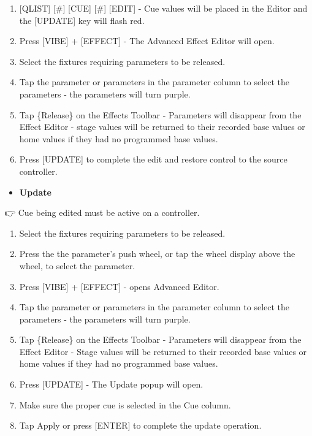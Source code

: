 \documentclass[
]{article}
\providecommand{\tightlist}{%
  \setlength{\itemsep}{0pt}\setlength{\parskip}{0pt}}
\begin{document}
\begin{enumerate}
\def\labelenumi{\arabic{enumi}.}
\item
  {[}QLIST{]} {[}\#{]} {[}CUE{]} {[}\#{]} {[}EDIT{]} - Cue values will be placed in the Editor and the {[}UPDATE{]} key will flash red.
\item
  Press {[}VIBE{]} + {[}EFFECT{]} - The Advanced Effect Editor will open.
\item
  Select the fixtures requiring parameters to be released.
\item
  Tap the parameter or parameters in the parameter column to select the parameters - the parameters will turn purple.
\item
  Tap \{Release\} on the Effects Toolbar - Parameters will disappear from the Effect Editor - stage values will be returned to their recorded base values or home values if they had no programmed base values.
\item
  Press {[}UPDATE{]} to complete the edit and restore control to the source controller.
\end{enumerate}

\begin{itemize}
\tightlist
\item
  \textbf{Update}
\end{itemize}

👉 Cue being edited must be active on a controller.

\begin{enumerate}
\def\labelenumi{\arabic{enumi}.}
\item
  Select the fixtures requiring parameters to be released.
\item
  Press the the parameter's push wheel, or tap the wheel display above the wheel, to select the parameter.
\item
  Press {[}VIBE{]} + {[}EFFECT{]} - opens Advanced Editor.
\item
  Tap the parameter or parameters in the parameter column to select the parameters - the parameters will turn purple.
\item
  Tap \{Release\} on the Effects Toolbar - Parameters will disappear from the Effect Editor - Stage values will be returned to their recorded base values or home values if they had no programmed base values.
\item
  Press {[}UPDATE{]} - The Update popup will open.
\item
  Make sure the proper cue is selected in the Cue column.
\item
  Tap Apply or press {[}ENTER{]} to complete the update operation.
\end{enumerate}
\end{document}
